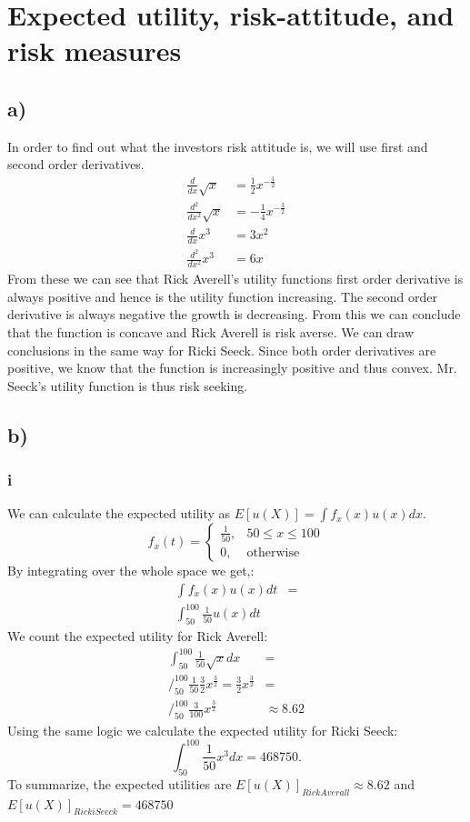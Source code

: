 \documentclass{article}
\begin{document}
\section{Expected utility, risk-attitude, and risk measures}
\subsection{a)}
	In order to find out what the investors risk attitude is, we will use first and second order derivatives. 
	\begin{align}
		\frac{d}{dx}\sqrt{x} &= \frac{1}{2}x^{-\frac{1}{2}} \\
		\frac{d^2}{dx^2}\sqrt{x} &= -\frac{1}{4}x^{-\frac{3}{2}} \\
		\frac{d}{dx}x^3 &=  3x^2\\
		\frac{d^2}{dx^2}x^3 &= 6x
	\end{align}
	From these we can see that Rick Averell's utility functions first order derivative is always positive and hence is the utility function increasing. The second order derivative is always negative the growth is decreasing. From this we can conclude that the function is concave and Rick Averell is risk averse.
	We can draw conclusions in the same way for Ricki Seeck. Since both order derivatives are positive, we know that the function is increasingly positive and thus convex. Mr. Seeck's utility function is thus risk seeking. 
\subsection{b)}
\subsubsection{i}
	We can calculate the expected utility as $E[u(X)] = \int f_x(x) u(x)dx$. 
	\begin{equation}
		f_x(t) = 
		\begin{cases}
			 \frac{1}{50}, &  50 \leq x \leq 100 \\
			 0, & \mbox{otherwise}
		\end{cases}
	\end{equation}
	By integrating over the whole space we get,:
	\begin{align}
		\int f_x(x) u(x)dt &= \\
		\int_{50}^{100} \frac{1}{50} u(x) dt& 
	\end{align}
	We count the expected utility for Rick Averell:
	\begin{align}
		\int_{50}^{100} \frac{1}{50} \sqrt{x} dx &=  \\
		\Bigg/_{50}^{100} \frac{1}{50} \frac{3}{2} x^{\frac{3}{2}} = \frac{3}{2} x^{\frac{3}{2}} &= \\
		\Bigg/_{50}^{100} \frac{3}{100} x^{\frac{3}{2}}	& \approx 8.62		
	\end{align}
	Using the same logic we calculate the expected utility for Ricki Seeck:
	\begin{equation}
		\int_{50}^{100} \frac{1}{50} x^3 dx  = 468750.	
	\end{equation}
	To summarize, the expected utilities are $E[u(X)]_{Rick Averall} \approx 8.62$ and $E[u(X)]_{Ricki Seeck} = 468750$
	
\end{document}
